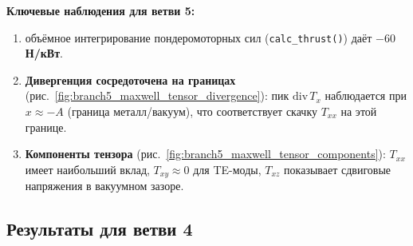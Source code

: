 \documentclass[a4paper,12pt]{article}
\begin{document}
\textbf{Ключевые наблюдения для ветви 5:}

\begin{enumerate}


    \item %
    объёмное интегрирование пондеромоторных сил
    (\texttt{calc\_thrust()}) даёт \textbf{$-60$ Н/кВт}.

    \item \textbf{Дивергенция сосредоточена на границах} (рис.~\ref{fig:branch5_maxwell_tensor_divergence}):
    пик $\text{div}\,T_x$ наблюдается при $x \approx -A$ (граница металл/вакуум),
    что соответствует скачку $T_{xx}$ на этой границе.

    \item \textbf{Компоненты тензора} (рис.~\ref{fig:branch5_maxwell_tensor_components}):
    $T_{xx}$ имеет наибольший вклад, $T_{xy} \approx 0$ для TE-моды,
    $T_{xz}$ показывает сдвиговые напряжения в вакуумном зазоре.
\end{enumerate}

\subsection{Результаты для ветви 4}
\end{document}
